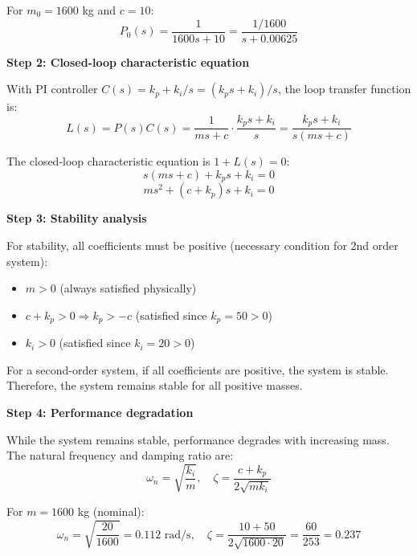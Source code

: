 \documentclass[11pt,a4paper]{article}
\begin{document}
For $m_0 = 1600$ kg and $c = 10$:
\begin{equation}
  P_0(s) = \frac{1}{1600s + 10} = \frac{1/1600}{s + 0.00625}
\end{equation}

\textbf{Step 2: Closed-loop characteristic equation}

With PI controller $C(s) = k_p + k_i/s = (k_ps + k_i)/s$, the loop transfer function is:
\begin{equation}
  L(s) = P(s)C(s) = \frac{1}{ms + c} \cdot \frac{k_ps + k_i}{s} = \frac{k_ps + k_i}{s(ms + c)}
\end{equation}

The closed-loop characteristic equation is $1 + L(s) = 0$:
\begin{equation}
  s(ms + c) + k_ps + k_i = 0
\end{equation}
\begin{equation}
  ms^2 + (c + k_p)s + k_i = 0
\end{equation}

\textbf{Step 3: Stability analysis}

For stability, all coefficients must be positive (necessary condition for 2nd order system):
\begin{itemize}
  \item $m > 0$ (always satisfied physically)
  \item $c + k_p > 0 \Rightarrow k_p > -c$ (satisfied since $k_p = 50 > 0$)
  \item $k_i > 0$ (satisfied since $k_i = 20 > 0$)
\end{itemize}

For a second-order system, if all coefficients are positive, the system is stable. Therefore, the system remains stable for all positive masses.

\textbf{Step 4: Performance degradation}

While the system remains stable, performance degrades with increasing mass. The natural frequency and damping ratio are:
\begin{equation}
  \omega_n = \sqrt{\frac{k_i}{m}}, \quad \zeta = \frac{c + k_p}{2\sqrt{mk_i}}
\end{equation}

For $m = 1600$ kg (nominal):
\begin{equation}
  \omega_n = \sqrt{\frac{20}{1600}} = 0.112 \text{ rad/s}, \quad \zeta = \frac{10 + 50}{2\sqrt{1600 \cdot 20}} = \frac{60}{253} = 0.237
\end{equation}
\end{document}
